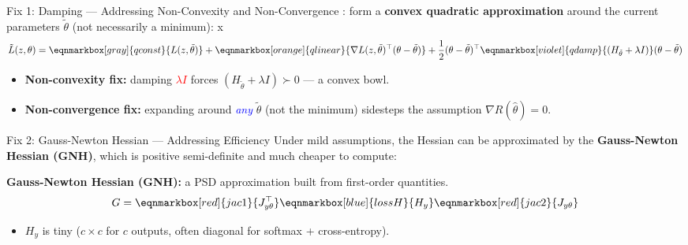 \documentclass[aspectratio=169]{beamer}
\renewcommand{\emph}[1]{\textit{\textcolor{blue}{#1}}}
\newcommand{\remph}[1]{\textit{\textcolor{red}{#1}}}
\begin{document}
\begin{frame}{Fix 1: Damping --- Addressing Non-Convexity and Non-Convergence}
    \citet{koh2017understanding}: form a \textbf{convex quadratic approximation} around the current parameters $\tilde{\theta}$ (not necessarily a minimum):
x
    \begin{equation}
        \tilde{L}(z, \theta) = \eqnmarkbox[gray]{qconst}{L(z, \tilde{\theta})} + \eqnmarkbox[orange]{qlinear}{\nabla L(z, \tilde{\theta})^\top (\theta - \tilde{\theta})} + \frac{1}{2}(\theta - \tilde{\theta})^\top \eqnmarkbox[violet]{qdamp}{(H_{\tilde{\theta}} + \lambda I)} (\theta - \tilde{\theta})
    \end{equation}

    \pause
    \vspace{1.3cm}
    \begin{itemize}\setlength\itemsep{0.4em}
        \item \textbf{Non-convexity fix:} damping \remph{$\lambda I$} forces $(H_{\tilde{\theta}} + \lambda I) \succ 0$ --- a convex bowl.
        \item \textbf{Non-convergence fix:} expanding around \emph{any} $\tilde{\theta}$ (not the minimum) sidesteps the assumption $\nabla R(\hat\theta) = 0$.
    \end{itemize}
\end{frame}


\begin{frame}{Fix 2: Gauss-Newton Hessian --- Addressing Efficiency}
    Under mild assumptions, the Hessian can be approximated by the \textbf{Gauss-Newton Hessian (GNH)}, which is positive semi-definite and much cheaper to compute:

    \vspace{0.5cm}
    \textbf{Gauss-Newton Hessian (GNH):} a PSD approximation built from first-order quantities.
    \vspace{1em}
    \begin{equation}
        G = \eqnmarkbox[red]{jac1}{J_{y\theta}^\top} \eqnmarkbox[blue]{lossH}{H_y} \eqnmarkbox[red]{jac2}{J_{y\theta}}
    \end{equation}

    \pause
    \vspace{2em}
    \begin{itemize}\setlength\itemsep{0.3em}
        \item $H_y$ is tiny ($c\times c$ for $c$ outputs, often diagonal for softmax + cross-entropy).
    \end{itemize}
\end{frame}
\end{document}
